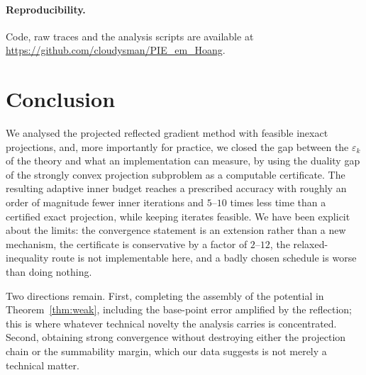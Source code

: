 \documentclass[11pt]{article}
\theoremstyle{plain}
\theoremstyle{definition}
\theoremstyle{remark}
\begin{document}
\paragraph{Reproducibility.}
Code, raw traces and the analysis scripts are available at
\url{https://github.com/cloudysman/PIE_em_Hoang}.

\section{Conclusion}
\label{sec:concl}

We analysed the projected reflected gradient method with feasible inexact
projections, and, more importantly for practice, we closed the gap between the
$\varepsilon_k$ of the theory and what an implementation can measure, by using
the duality gap of the strongly convex projection subproblem as a computable
certificate. The resulting adaptive inner budget reaches a prescribed accuracy
with roughly an order of magnitude fewer inner iterations and $5$--$10$ times
less time than a certified exact projection, while keeping iterates feasible.
We have been explicit about the limits: the convergence statement is an
extension rather than a new mechanism, the certificate is conservative by a
factor of $2$--$12$, the relaxed-inequality route is not implementable here,
and a badly chosen schedule is worse than doing nothing.

Two directions remain. First, completing the assembly of the potential in
Theorem~\ref{thm:weak}, including the base-point error amplified by the
reflection; this is where whatever technical novelty the analysis carries is
concentrated. Second, obtaining strong convergence without destroying either
the projection chain or the summability margin, which our data suggests is not
merely a technical matter.
\end{document}
